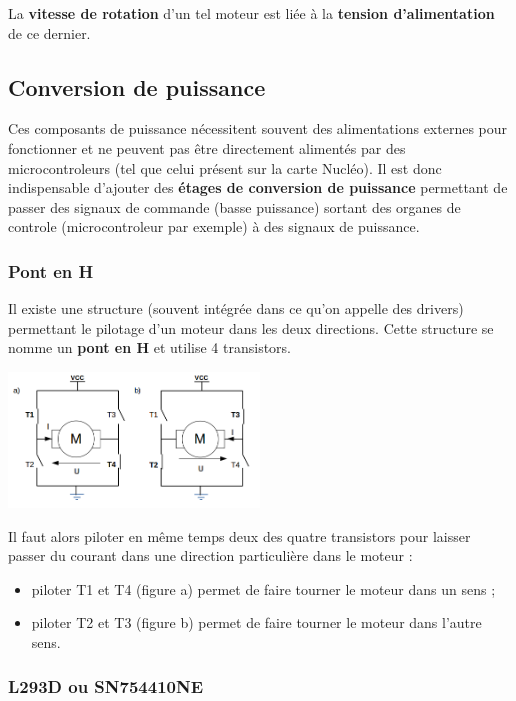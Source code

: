\documentclass[a4paper,11pt,titlepage]{article} %
\begin{document}
La \textbf{vitesse de rotation} d'un tel moteur est liée à la \textbf{tension d'alimentation} de ce dernier. 

\subsection{Conversion de puissance}

Ces composants de puissance nécessitent souvent des alimentations externes pour fonctionner et ne peuvent pas être directement alimentés par des microcontroleurs (tel que celui présent sur la carte Nucléo). Il est donc indispensable d'ajouter des \textbf{étages de conversion de puissance} permettant de passer des signaux de commande (basse puissance) sortant des organes de controle (microcontroleur par exemple) à des signaux de puissance.


\subsubsection{Pont en H}

Il existe une structure (souvent intégrée dans ce qu'on appelle des drivers) permettant le pilotage d'un moteur dans les deux directions. Cette structure se nomme un \textbf{pont en H} et utilise 4 transistors.


\begin{center}
	\includegraphics[width=0.5\textwidth]{images/MINE_Composants_PontH_Fonctionnement.png}
\end{center}


Il faut alors piloter en même temps deux des quatre transistors pour laisser passer du courant dans une direction particulière dans le moteur :

\begin{itemize}
	\item piloter T1 et T4 (figure a) permet de faire tourner le moteur dans un sens ;
	\item piloter T2 et T3 (figure b) permet de faire tourner le moteur dans l'autre sens.
\end{itemize}

\subsubsection{L293D ou SN754410NE}
\end{document}
